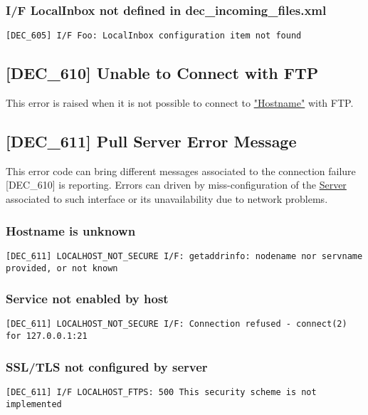\documentclass[dec_sum_main.tex]{subfiles}
\begin{document}
\subsubsection{I/F LocalInbox not defined in  dec\_incoming\_files.xml }
\begin{verbatim}
[DEC_605] I/F Foo: LocalInbox configuration item not found
\end{verbatim}

\label{DEC610}
\subsection{[DEC\_610] Unable to Connect with FTP}
This error is raised when it is not possible to connect to \hyperref[Config_Server]{"Hostname"} with FTP.

\subsection{[DEC\_611] Pull Server Error Message}
\label{DEC611}
This error code can bring different messages associated to the connection failure [DEC\_610] is reporting. Errors can driven by miss-configuration of the \hyperref[Config_Server]{Server} associated to such interface or its unavailability due to network problems.

\subsubsection{Hostname is unknown}
\begin{verbatim}
[DEC_611] LOCALHOST_NOT_SECURE I/F: getaddrinfo: nodename nor servname provided, or not known
\end{verbatim}

\subsubsection{Service not enabled by host}
\begin{verbatim}
[DEC_611] LOCALHOST_NOT_SECURE I/F: Connection refused - connect(2) for 127.0.0.1:21
\end{verbatim}

\subsubsection{SSL/TLS not configured by server}
\begin{verbatim}
[DEC_611] I/F LOCALHOST_FTPS: 500 This security scheme is not implemented
\end{verbatim}
\end{document}
